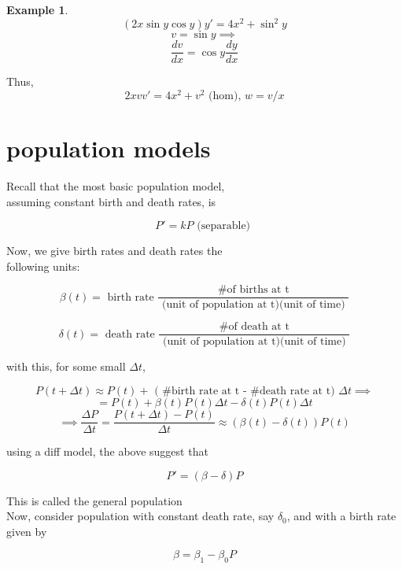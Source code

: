 \documentclass[10pt,a4paper]{article}
\theoremstyle{definition}
\newtheorem*{example}{Example}
\begin{document}

\begin{example}
  \[ (2x \sin y \cos y ) y' = 4x^2 + \sin^2y \]
  \[ v = \sin y \implies\]
  \[ \frac{dv}{dx} = \cos y \frac{dy}{dx} \]

  Thus, 
  \[ 2xvv' = 4x^2 + v^2 \text{ (hom),  } w = v/x \]
\end{example}

\section{population models}

  Recall that the most basic population model, \\ 
  assuming constant birth and death rates, is 

  \[ P' = kP \text{ (separable)  } \]

  Now, we give birth rates and death rates the \\
  following units: 

  \[ \beta(t) = \text{ birth rate } \frac{ \text{ \# of births at t }}{
  \text{ (unit of population at t)(unit of time) }} \]

  \[ \delta(t) = \text{ death rate } \frac{ \text{ \# of death at t }}{
  \text{ (unit of population at t)(unit of time) }} \]

  with this, for some small \( \Delta t \), 

  \[ P(t + \Delta t) \approx P(t) + \text{ ( \# birth rate at t - \# death rate at t) } \Delta t \implies   \]
  \[ = P(t) + \beta (t) P(t) \Delta t - \delta (t) P(t) \Delta t \]
  \[ \implies \frac{ \Delta P}{ \Delta t} =  \frac{P(t + \Delta t) -P(t)}{ \Delta
  t}  \approx ( \beta(t) - \delta(t) ) P(t)  \]

  using a diff model, the above suggest that 

  \[ \boxed{ P' = (\beta - \delta ) P} \]

  This is called the general population \\[5mm]

  Now, consider population with constant 
  death rate, say \( \delta_0 \), and with a birth 
  rate given by 

  \[ \beta = \beta_1 - \beta_0P \]
\end{document}
